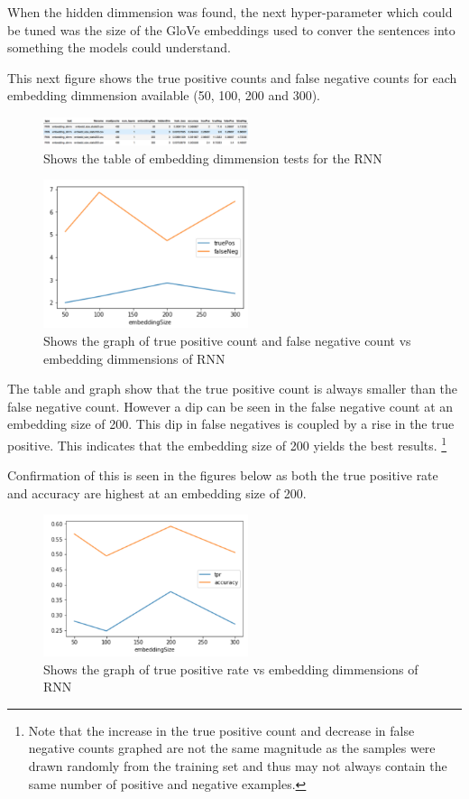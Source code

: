 \documentclass[twoside,twocolumn]{article}
\begin{document}
When the hidden dimmension was found, the next hyper-parameter which could be tuned was the size
of the GloVe embeddings used to conver the sentences into something the models could understand.

This next figure shows the true positive counts and false negative counts for each embedding dimmension
available (50, 100, 200 and 300).

\begin{figure}[H]
\includegraphics[width=6cm]{rnn_embeddSize_test_table}
\centering
\caption{Shows the table of embedding dimmension tests for the RNN}
\end{figure}

\begin{figure}[H]
\includegraphics[width=6cm]{rnn_embeddSize_test_graph}
\centering
\caption{Shows the graph of true positive count and false negative count vs embedding dimmensions of RNN}
\end{figure}

The table and graph show that the true positive count is always smaller than the false negative count.
However a dip can be seen in the false negative count at an embedding size of 200. This dip in
false negatives is coupled by a rise in the true positive. This indicates that the embedding size of 200
yields the best results. \footnote{Note that the increase in the true positive count and decrease in false
negative counts graphed are not the same magnitude as the samples were drawn randomly from the training
set and thus may not always contain the same number of positive and negative examples.}

Confirmation of this is seen in the figures below as both the true positive rate and accuracy
are highest at an embedding size of 200.

\begin{figure}[H]
\includegraphics[width=6cm]{rnn_embeddSize_test_tpr-graph}
\caption{Shows the graph of true positive rate vs embedding dimmensions of RNN}
\centering
\end{figure}
\end{document}
